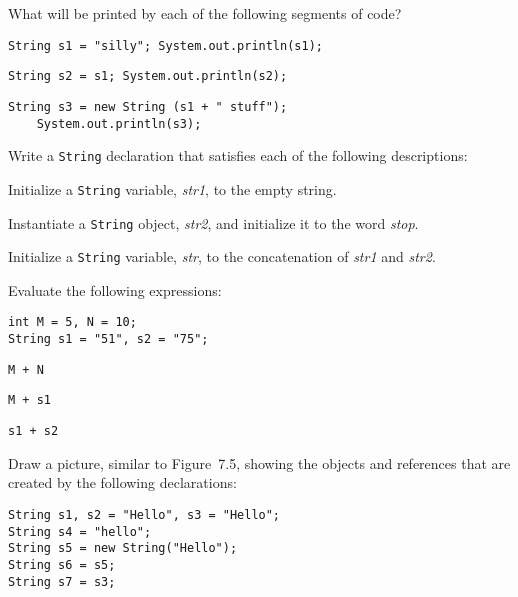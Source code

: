 \label{self-study-exercises}
\begin{SSTUDY}
\item  What will be printed by each of the following segments of code?
\begin{EXRLL}
\item  \verb|String s1 = "silly"; System.out.println(s1);|
\item  \verb|String s2 = s1; System.out.println(s2);|
\item  \verb|String s3 = new String (s1 + " stuff");|
       \\ \verb|    System.out.println(s3);|
\end{EXRLL}

\item  Write a {\tt String} declaration that satisfies each
of the following descriptions:
\begin{EXRLL}
\item  Initialize a {\tt String} variable, {\it str1}, to the empty
        string.
\item  Instantiate a {\tt String} object, {\it str2}, and initialize
        it to the word {\it stop}.
\item  Initialize a {\tt String} variable, {\it str}, to the concatenation of
{\it str1} and {\it str2}.
\end{EXRLL}

\item  Evaluate the following expressions:

\begin{jjjlisting}
\begin{lstlisting}
int M = 5, N = 10;
String s1 = "51", s2 = "75";
\end{lstlisting}
\end{jjjlisting}

\begin{EXRLL}
\begin{multicols}{3}
\item \verb|M + N|
\item \verb|M + s1|
\item \verb|s1 + s2|     
\end{multicols}
\end{EXRLL}


\item  Draw a picture, similar to Figure~7.5, showing the
objects and references that are created by the following declarations:
\begin{jjjlisting}
\begin{lstlisting}
String s1, s2 = "Hello", s3 = "Hello";
String s4 = "hello";
String s5 = new String("Hello");
String s6 = s5;
String s7 = s3;
\end{lstlisting}
\end{jjjlisting}

\end{SSTUDY}

